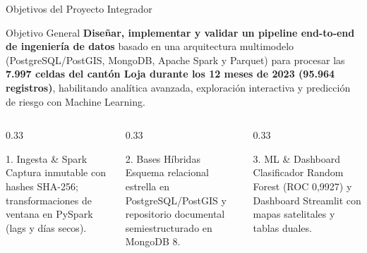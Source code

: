 \documentclass[aspectratio=169,11pt]{beamer}
\newcommand{\seccionactual}{Sustentaci\'on Final}
\begin{document}
\renewcommand{\seccionactual}{Objetivos}
\begin{frame}{Objetivos del Proyecto Integrador}
  \begin{block}{Objetivo General}
    \textbf{Dise\~nar, implementar y validar un pipeline end-to-end de ingenier\'ia de datos} basado en una arquitectura multimodelo (PostgreSQL/PostGIS, MongoDB, Apache Spark y Parquet) para procesar las \textbf{7.997 celdas del cant\'on Loja durante los 12 meses de 2023 (95.964 registros)}, habilitando anal\'itica avanzada, exploraci\'on interactiva y predicci\'on de riesgo con Machine Learning.
  \end{block}
  \vspace{0.2cm}
  \begin{columns}[t]
    \begin{column}{0.33\textwidth}
      \begin{exampleblock}{1. Ingesta \& Spark}
        \scriptsize Captura inmutable con hashes SHA-256; transformaciones de ventana en PySpark (lags y d\'ias secos).
      \end{exampleblock}
    \end{column}
    \begin{column}{0.33\textwidth}
      \begin{exampleblock}{2. Bases H\'ibridas}
        \scriptsize Esquema relacional estrella en PostgreSQL/PostGIS y repositorio documental semiestructurado en MongoDB 8.
      \end{exampleblock}
    \end{column}
    \begin{column}{0.33\textwidth}
      \begin{exampleblock}{3. ML \& Dashboard}
        \scriptsize Clasificador Random Forest (ROC 0,9927) y Dashboard Streamlit con mapas satelitales y tablas duales.
      \end{exampleblock}
    \end{column}
  \end{columns}
\end{frame}
\end{document}
